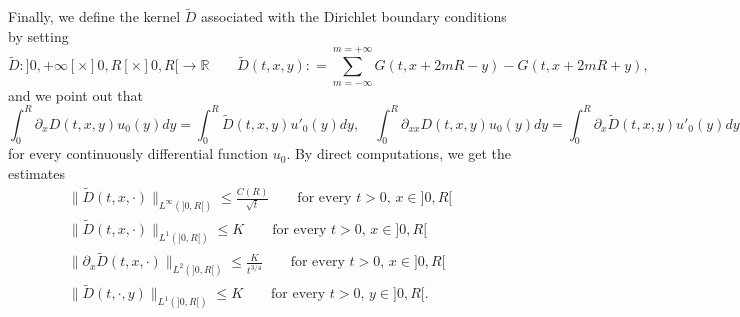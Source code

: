 \documentclass[11pt,leqno]{amsart}
\numberwithin{equation}{section}
\begin{document}
Finally, we define the kernel $\tilde D$ associated with the Dirichlet boundary conditions by setting 
\begin{equation}
 \label{e:Ditilde}
     \tilde D: ]0, + \infty[ \times ]0, R[ \times ]0, R[ \to {\mathbb{R}} \qquad 
     \tilde D(t, x, y) : = \sum_{m= - \infty}^{m = + \infty} G(t, x + 2m R - y)-
     G(t, x + 2m R +y), 
 \end{equation}
and we point out that 
\begin{equation}
\label{e:dualita}
    \int_0^R \partial_x D(t, x, y) u_0(y) dy =
   \int_0^R \tilde D(t, x, y) u'_0(y) dy, 
   \quad 
   \int_0^R \partial_{xx} D(t, x, y) u_0(y) dy =
   \int_0^R {\partial_x }  \tilde D(t, x, y) u'_0(y) dy
\end{equation}
for every continuously differential function $u_0$. By direct computations, we get the estimates 
\begin{eqnarray}
    \| \tilde D(t, x, \cdot ) \|_{L^\infty (]0, R[)}
    \leq \frac{C(R)}{\sqrt{t}}
    \qquad \text{for every $t>0$, $x \in ]0, R[$} 
    \label{e:tDlinfty} \\
    \| \tilde D(t, x, \cdot ) \|_{L^1(]0, R[)}
    \leq K
    \qquad \text{for every $t>0$, $x \in ]0, R[$} 
    \label{e:tDuno} \\
     \| \partial_x \tilde D(t, x, \cdot ) \|_{L^2 (]0, R[)}
    \leq \frac{K}{t^{3/4}}
    \qquad \text{for every $t>0$, $x \in ]0, R[$} 
    \label{e:tDxdue} \\
    \| \tilde D(t, \cdot, y ) \|_{L^1(]0, R[)}
    \leq K
    \qquad \text{for every $t>0$, $y \in ]0, R[$.} 
    \label{e:tDunox} 
\end{eqnarray}
\end{document}
